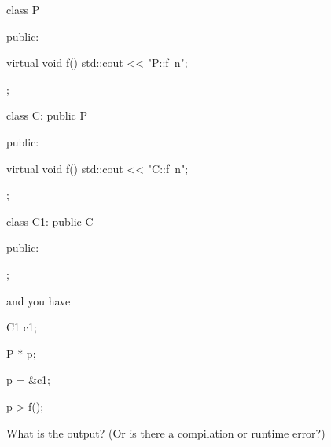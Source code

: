 
\begin{console}

class P

{

public:

     virtual void f() { std::cout << "P::f\ n"; }

};



class C: public P

{

public:

     virtual void f() { std::cout << "C::f\ n"; }

};



class C1: public C

{

public:

};

\end{console}



and you have



\begin{console}

C1 c1;

P * p;

p = &c1;

p-> f();

\end{console}



What is the output? (Or is there a compilation or runtime error?)

